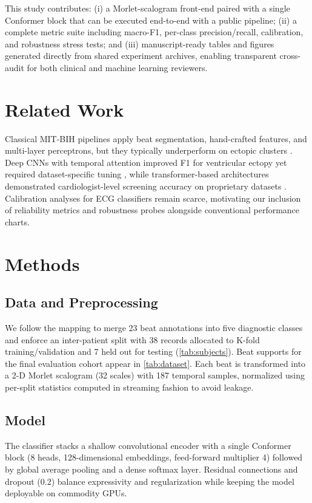 \documentclass[preprint,3p]{elsarticle}
\begin{document}
This study contributes: (i) a Morlet-scalogram front-end paired with a single Conformer block that can be executed end-to-end with a public pipeline; (ii) a complete metric suite including macro-F1, per-class precision/recall, calibration, and robustness stress tests; and (iii) manuscript-ready tables and figures generated directly from shared experiment archives, enabling transparent cross-audit for both clinical and machine learning reviewers.

\section{Related Work}
\label{sec:related}
Classical MIT-BIH pipelines apply beat segmentation, hand-crafted features, and multi-layer perceptrons, but they typically underperform on ectopic clusters \cite{moody2001mitbih}. Deep CNNs with temporal attention improved F1 for ventricular ectopy yet required dataset-specific tuning \cite{acharya2017ecgdeep}, while transformer-based architectures demonstrated cardiologist-level screening accuracy on proprietary datasets \cite{rajpurkar2017cardiologist}. Calibration analyses for ECG classifiers remain scarce, motivating our inclusion of reliability metrics and robustness probes alongside conventional performance charts.

\section{Methods}
\label{sec:methods}
\subsection{Data and Preprocessing}
We follow the \aami{} mapping to merge 23 beat annotations into five diagnostic classes and enforce an inter-patient split with 38 records allocated to K-fold training/validation and 7 held out for testing (\autoref{tab:subjects}). Beat supports for the final evaluation cohort appear in \autoref{tab:dataset}. Each beat is transformed into a 2-D Morlet scalogram (32 scales) with 187 temporal samples, normalized using per-split statistics computed in streaming fashion to avoid leakage.

\subsection{Model}
The classifier stacks a shallow convolutional encoder with a single Conformer block (8 heads, 128-dimensional embeddings, feed-forward multiplier 4) followed by global average pooling and a dense softmax layer. Residual connections and dropout (0.2) balance expressivity and regularization while keeping the model deployable on commodity GPUs.
\end{document}
